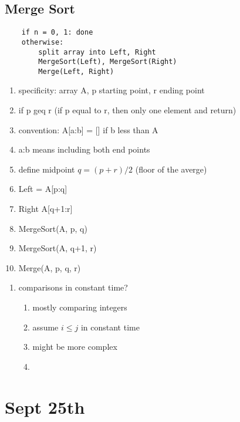 \documentclass{article}
\begin{document}
\subsection{Merge Sort}
\begin{verbatim}
    if n = 0, 1: done
    otherwise:
        split array into Left, Right
        MergeSort(Left), MergeSort(Right)
        Merge(Left, Right)
\end{verbatim}
\begin{enumerate}
    \item specificity: array A, p starting point, r ending point
    \item if p geq r (if p equal to r, then only one element and return)
    \item convention: A[a:b] = [] if b less than A
    \item a:b means including both end points
    \item define midpoint $q = (p+r)/2$ (floor of the averge)
    \item Left = A[p:q]
    \item Right A[q+1:r]
    \item MergeSort(A, p, q)
    \item MergeSort(A, q+1, r)
    \item Merge(A, p, q, r)
\end{enumerate}
\begin{enumerate}

\item comparisons in constant time? \begin{enumerate}
    \item mostly comparing integers
    \item assume $i \leq j$ in constant time
    \item might be more complex
    \item    
\end{enumerate}
\end{enumerate}

\section{Sept 25th}
\end{document}
